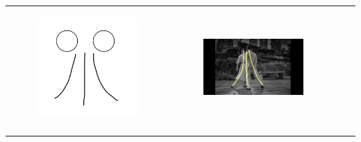 \begin{table}[!htb]
\begin{tabular}{cccc}
\begin{subfigure}{0.2\textwidth}\centering\includegraphics[scale=0.1]{img/06keyframe}\end{subfigure}&
\begin{subfigure}{0.23\textwidth}\centering\includegraphics[scale=0.08]{img/keyframe_case_6_(3)}\end{subfigure}\\
\quad

\end{tabular}
\end{table}
